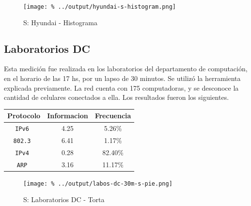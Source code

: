 \documentclass[final,inline,a4paper,narroweqnarray]{ieee}
\begin{document}
    \begin{figure}[h]\begin{center}
      \texttt{[image: \%
      ../output/hyundai-s-histogram.png]}
      \caption{S: Hyundai - Histograma}
      \label{hyundai-s-histogram}
    \end{center}\end{figure}

  \subsection{Laboratorios DC}

    Esta medición fue realizada en los laboratorios del departamento de
    computación, en el horario de las 17 hs, por un lapso de 30 minutos.
    Se utilizó la herramienta explicada previamente. La red cuenta con 175
    computadoras, y se desconoce la cantidad de celulares conectados a ella.
    Los resultados fueron los siguientes.
  
    \begin{table}\begin{center}
      \begin{tabular}{|c|c|c|}
      \hline
      \textbf{Protocolo} & \textbf{Informacion} & \textbf{Frecuencia} \\ \hline
      \texttt{IPv6      }& 4.25        & 5.26\%     \\ \hline
      \texttt{802.3     }& 6.41        & 1.17\%     \\ \hline
      \texttt{IPv4      }& 0.28        & 82.40\%    \\ \hline
      \texttt{ARP       }& 3.16        & 11.17\%    \\ \hline
      \end{tabular}
      \label{labos-dc-s-table}
    \end{center}\end{table}

    \begin{figure}[ht]\begin{center}
      \texttt{[image: \%
      ../output/labos-dc-30m-s-pie.png]}
      \vspace{-3em}
      \caption{S: Laboratorios DC - Torta}
      \label{labos-dc-30m-s-pie}
    \end{center}\end{figure}
\end{document}
